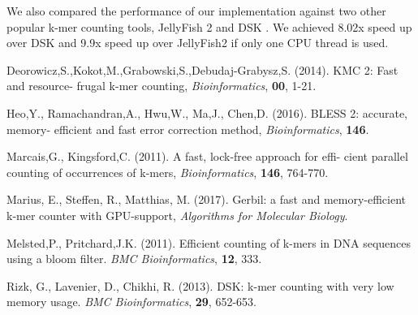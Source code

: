 \documentclass{bioinfo}
\begin{document}
We also compared the performance of our implementation against two other popular k-mer
counting tools, JellyFish 2 and DSK \citep{Rizk13}.
We achieved 8.02x speed up over DSK and 9.9x speed up over JellyFish2 if only one CPU
thread is used.

\begin{thebibliography}{}

Deorowicz,S.,Kokot,M.,Grabowski,S.,Debudaj-Grabysz,S. (2014). KMC 2: Fast and resource-
frugal k-mer counting, {\it Bioinformatics}, {\bf 00}, 1-21.

Heo,Y., Ramachandran,A., Hwu,W., Ma,J., Chen,D. (2016). BLESS 2: accurate, memory-
efficient and fast error correction method, {\it Bioinformatics}, {\bf 146}.

Marcais,G., Kingsford,C. (2011).  A fast, lock-free approach for effi-
cient parallel counting of occurrences of k-mers, {\it Bioinformatics}, {\bf 146},
764-770.

Marius, E., Steffen, R., Matthias, M. (2017). Gerbil: a fast and memory-efficient k-mer
counter with GPU-support, {\it Algorithms for Molecular Biology}.

Melsted,P., Pritchard,J.K. (2011). Efficient counting of k-mers in DNA sequences
using a bloom filter. {\it BMC Bioinformatics}, {\bf 12}, 333.

Rizk, G., Lavenier, D., Chikhi, R. (2013). DSK: k-mer counting with very low memory usage.
{\it BMC Bioinformatics}, {\bf 29}, 652-653.
\end{thebibliography}
\end{document}
